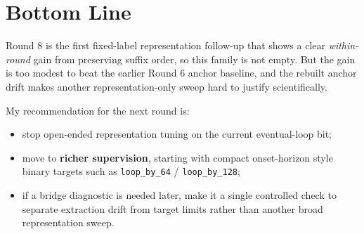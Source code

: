 \documentclass[11pt]{article}
\begin{document}
\section*{Bottom Line}
Round 8 is the first fixed-label representation follow-up that shows a clear \emph{within-round} gain from preserving suffix order, so this family is not empty. But the gain is too modest to beat the earlier Round 6 anchor baseline, and the rebuilt anchor drift makes another representation-only sweep hard to justify scientifically.

My recommendation for the next round is:
\begin{itemize}
  \item stop open-ended representation tuning on the current eventual-loop bit;
  \item move to \textbf{richer supervision}, starting with compact onset-horizon style binary targets such as \texttt{loop\_by\_64} / \texttt{loop\_by\_128};
  \item if a bridge diagnostic is needed later, make it a single controlled check to separate extraction drift from target limits rather than another broad representation sweep.
\end{itemize}
\end{document}
